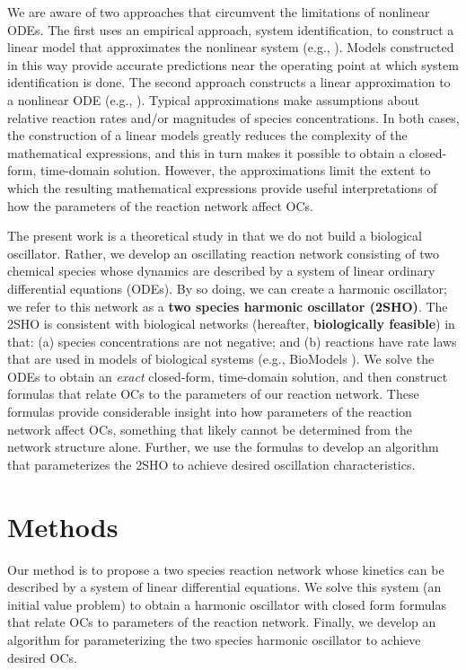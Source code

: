 \documentclass{bmcart}
\begin{document}
We are aware of two approaches that circumvent the limitations of nonlinear ODEs. The first uses an empirical approach, system identification, to construct a linear model that approximates the nonlinear system  (e.g., \cite{mahrou2022}). Models constructed in this way provide accurate predictions near the operating point at which system identification is done. The second approach constructs a linear approximation to a nonlinear ODE (e.g.,  \cite{kut_analytical_2009}). Typical approximations make assumptions about relative reaction rates and/or magnitudes of species concentrations. In both cases, the construction of a linear models greatly reduces the complexity of the mathematical expressions, and this in turn makes it possible to obtain a closed-form, time-domain solution. However, the approximations limit the extent to which the resulting mathematical expressions provide useful interpretations of how the parameters of the reaction network affect OCs.

The present work is a theoretical study in that we do not build a biological oscillator. Rather, we develop an oscillating reaction network consisting of two chemical species whose dynamics are described by a system of linear ordinary differential equations (ODEs). By so doing, we can create a harmonic oscillator; we refer to this network as a {\bf two species harmonic oscillator (2SHO)}. The 2SHO is consistent with biological networks (hereafter, {\bf biologically feasible}) in that: (a) species concentrations are not negative; and (b) reactions have rate laws that are used in models of biological systems (e.g., BioModels \cite{malik-sheriff_biomodels-15_2020}). We solve the ODEs to obtain an {\em exact} closed-form, time-domain solution, and then construct formulas that relate OCs to the parameters of our reaction network. These formulas provide considerable insight into how parameters of the reaction network affect OCs, something that likely cannot be determined from the network structure alone. Further, we use the formulas to develop an algorithm that parameterizes the 2SHO to achieve desired oscillation characteristics.


\section*{Methods}
Our method is to propose a two species reaction network whose kinetics can be described by a system of linear differential equations. We solve this system (an initial value problem) to obtain a harmonic oscillator with closed form formulas that relate OCs to parameters of the reaction network. Finally, we develop an algorithm for parameterizing the two species harmonic oscillator to achieve desired OCs.
\end{document}
